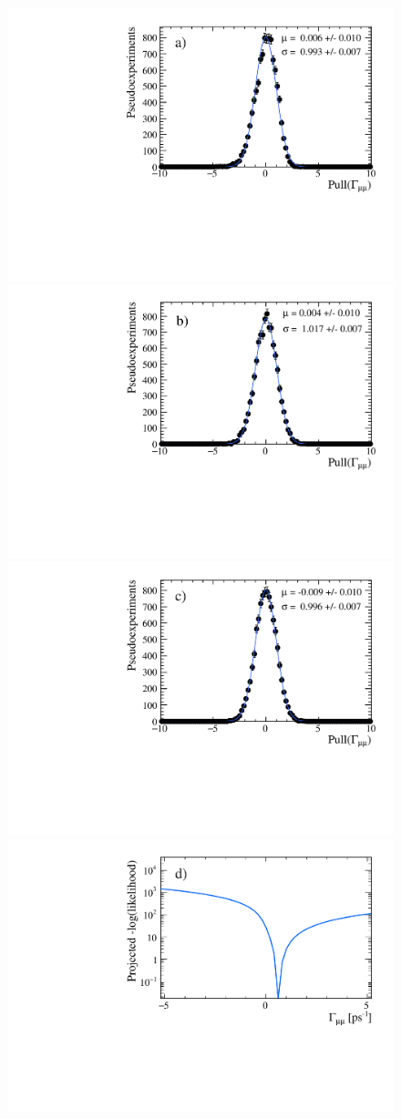 {%

\begin{figure}[tbp]
    \centering
       \includegraphics[width=0.49 \textwidth]{./Figs/LifetimeMeasurement/CKM_simple_gamma_pull.pdf}
     \includegraphics[width= 0.49 \textwidth]{./Figs/LifetimeMeasurement/50fb_gamma_pull.pdf}
      \includegraphics[width=0.49 \textwidth]{./Figs/LifetimeMeasurement/300fb_simple_gamma_pull.pdf}
        \includegraphics[width= 0.49 \textwidth]{./Figs/LifetimeMeasurement/Gamma_LL.pdf}  


\end{figure}}

